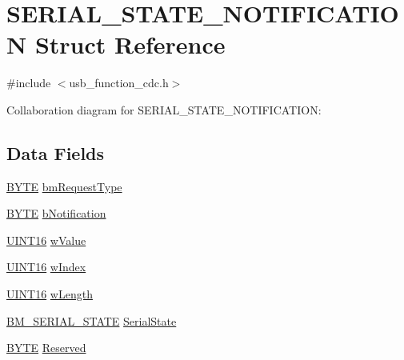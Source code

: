 \hypertarget{struct_s_e_r_i_a_l___s_t_a_t_e___n_o_t_i_f_i_c_a_t_i_o_n}{}\section{S\+E\+R\+I\+A\+L\+\_\+\+S\+T\+A\+T\+E\+\_\+\+N\+O\+T\+I\+F\+I\+C\+A\+T\+I\+O\+N Struct Reference}
\label{struct_s_e_r_i_a_l___s_t_a_t_e___n_o_t_i_f_i_c_a_t_i_o_n}


{\ttfamily \#include $<$usb\+\_\+function\+\_\+cdc.\+h$>$}



Collaboration diagram for S\+E\+R\+I\+A\+L\+\_\+\+S\+T\+A\+T\+E\+\_\+\+N\+O\+T\+I\+F\+I\+C\+A\+T\+I\+O\+N\+:
\subsection*{Data Fields}
\begin{DoxyCompactItemize}
\item 
\hyperlink{_generic_type_defs_8h_a4ae1dab0fb4b072a66584546209e7d58}{B\+Y\+T\+E} \hyperlink{struct_s_e_r_i_a_l___s_t_a_t_e___n_o_t_i_f_i_c_a_t_i_o_n_a88be425a3af4e023d0b834b835814c56}{bm\+Request\+Type}
\item 
\hyperlink{_generic_type_defs_8h_a4ae1dab0fb4b072a66584546209e7d58}{B\+Y\+T\+E} \hyperlink{struct_s_e_r_i_a_l___s_t_a_t_e___n_o_t_i_f_i_c_a_t_i_o_n_aabbcac3b15eeb25d9422c815534afa03}{b\+Notification}
\item 
\hyperlink{_generic_type_defs_8h_acfa284fa8026c4aace2728f7f15d6c13}{U\+I\+N\+T16} \hyperlink{struct_s_e_r_i_a_l___s_t_a_t_e___n_o_t_i_f_i_c_a_t_i_o_n_a7e99ff5607397c6492e3e2b22367ec4b}{w\+Value}
\item 
\hyperlink{_generic_type_defs_8h_acfa284fa8026c4aace2728f7f15d6c13}{U\+I\+N\+T16} \hyperlink{struct_s_e_r_i_a_l___s_t_a_t_e___n_o_t_i_f_i_c_a_t_i_o_n_ad57c9fae0c17b5db32f0170b0e12cad7}{w\+Index}
\item 
\hyperlink{_generic_type_defs_8h_acfa284fa8026c4aace2728f7f15d6c13}{U\+I\+N\+T16} \hyperlink{struct_s_e_r_i_a_l___s_t_a_t_e___n_o_t_i_f_i_c_a_t_i_o_n_a68c8a688e189c3ef3c333604d8914433}{w\+Length}
\item 
\hyperlink{union_b_m___s_e_r_i_a_l___s_t_a_t_e}{B\+M\+\_\+\+S\+E\+R\+I\+A\+L\+\_\+\+S\+T\+A\+T\+E} \hyperlink{struct_s_e_r_i_a_l___s_t_a_t_e___n_o_t_i_f_i_c_a_t_i_o_n_a3243bc4192af04c6a0fb0990722a1fc9}{Serial\+State}
\item 
\hyperlink{_generic_type_defs_8h_a4ae1dab0fb4b072a66584546209e7d58}{B\+Y\+T\+E} \hyperlink{struct_s_e_r_i_a_l___s_t_a_t_e___n_o_t_i_f_i_c_a_t_i_o_n_adba0129493ef67a85dd97e7e842ee410}{Reserved}
\end{DoxyCompactItemize}


